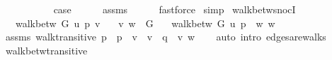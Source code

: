 \begin{isabellebody}
\ \ \isamarkupfalse%
\isanewline
{}\isamarkupfalse%
\isanewline
\ \ \isamarkupfalse%
\ {}\isanewline
\ \ \isamarkupfalse%
\ {\isacharquery}{\kern0pt}case\isanewline
\ \ \ \ \isamarkupfalse%
\ assms{\isacharparenleft}{\kern0pt}{}{\isacharparenright}{\kern0pt}\isanewline
\ \ \ \ \isamarkupfalse%
\ fastforce\isanewline
{}\isamarkupfalse%
\ simp{\isacharplus}{\kern0pt}%
\endisatagproof
{\isafoldproof}%
%
\isadelimproof
\isanewline
%
\endisadelimproof
%
\isadeliminvisible
\isanewline
%
\endisadeliminvisible
%
\isataginvisible
{}\isamarkupfalse%
\ walk{\isacharunderscore}{\kern0pt}betw{\isacharunderscore}{\kern0pt}snocI{\isacharcolon}{\kern0pt}\isanewline
\ \ \ {\isachardoublequoteopen}walk{\isacharunderscore}{\kern0pt}betw\ G\ u\ p\ v{\isachardoublequoteclose}\isanewline
\ \ \ {\isachardoublequoteopen}{\isacharbraceleft}{\kern0pt}v{\isacharcomma}{\kern0pt}\ w{\isacharbraceright}{\kern0pt}\ {\isasymin}\ G{\isachardoublequoteclose}\isanewline
\ \ \ {\isachardoublequoteopen}walk{\isacharunderscore}{\kern0pt}betw\ G\ u\ {\isacharparenleft}{\kern0pt}p\ {\isacharat}{\kern0pt}\ {\isacharbrackleft}{\kern0pt}w{\isacharbrackright}{\kern0pt}{\isacharparenright}{\kern0pt}\ w{\isachardoublequoteclose}%
\endisataginvisible
{\isafoldinvisible}%
%
\isadeliminvisible
\isanewline
%
\endisadeliminvisible
%
\isadelimproof
\ \ %
\endisadelimproof
%
\isatagproof
{}\isamarkupfalse%
\ assms\ walk{\isacharunderscore}{\kern0pt}transitive{\isacharbrackleft}{\kern0pt}\ {\isacharquery}{\kern0pt}p\ {\isacharequal}{\kern0pt}\ p\ \ {\isacharquery}{\kern0pt}v\ {\isacharequal}{\kern0pt}\ v\ \ {\isacharquery}{\kern0pt}q\ {\isacharequal}{\kern0pt}\ {\isachardoublequoteopen}{\isacharbrackleft}{\kern0pt}v{\isacharcomma}{\kern0pt}\ w{\isacharbrackright}{\kern0pt}{\isachardoublequoteclose}{\isacharbrackright}{\kern0pt}\isanewline
\ \ \isamarkupfalse%
\ {\isacharparenleft}{\kern0pt}auto\ intro{\isacharcolon}{\kern0pt}\ edges{\isacharunderscore}{\kern0pt}are{\isacharunderscore}{\kern0pt}walks{\isacharparenright}{\kern0pt}%
\endisatagproof
{\isafoldproof}%
%
\isadelimproof
\isanewline
%
\endisadelimproof
%
\isadeliminvisible
\isanewline
%
\endisadeliminvisible
%
\isataginvisible
{}\isamarkupfalse%
\ walk{\isacharunderscore}{\kern0pt}betw{\isacharunderscore}{\kern0pt}transitive{\isacharunderscore}{\kern0pt}{}{\isacharcolon}{\kern0pt}\isanewline

\end{isabellebody}
